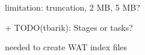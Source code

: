 \documentclass[conference]{IEEEtran}
\begin{document}

limitation: truncation, 2 MB, 5 MB?


+ TODO(tbarik): Stages or tasks?

needed to create WAT index files


\end{document}

